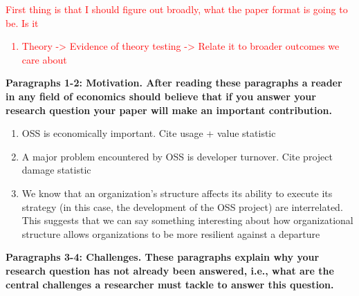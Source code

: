 \documentclass[source/paper/main.tex]{subfiles}
\begin{document}
\textcolor{red}{First thing is that I should figure out broadly, what the paper format is going to be. Is it
\begin{enumerate}
    \item Theory -> Evidence of theory testing -> Relate it to broader outcomes we care about
\end{enumerate}}

\textbf{Paragraphs 1-2: Motivation. After reading these paragraphs a reader in any field of economics should believe that if you answer your research question your paper will make an important contribution.}

\begin{enumerate}
    \item OSS is economically important. Cite usage + value statistic 
    \item A major problem encountered by OSS is developer turnover. Cite project damage statistic 
    \item We know that an organization's structure affects its ability to execute its strategy (in this case, the development of the OSS project) are interrelated. This suggests that we can say something interesting about how organizational structure allows organizations to be more resilient against a departure
\end{enumerate}

\textbf{Paragraphs 3-4: Challenges. These paragraphs explain why your research question has not already been answered, i.e., what are the central challenges a researcher must tackle to answer this question.}
\end{document}
